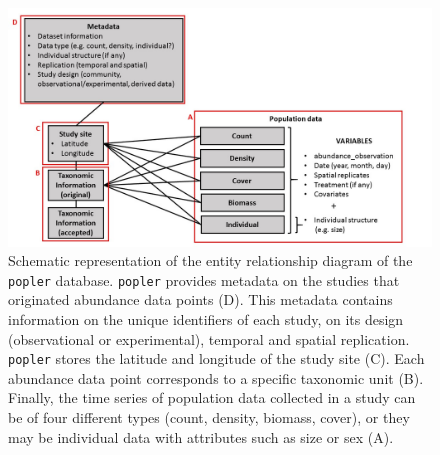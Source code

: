 \documentclass{article}\usepackage[]{graphicx}\usepackage[]{color}
\newcommand{\tom}[1]{{\textit{\color{red}{[#1]}}}}
\begin{document}
\newpage
\begin{figure}[h!]
  \begin{center}
    \includegraphics[scale=0.4]{schema}
    \caption{Schematic representation of the entity relationship diagram of the \texttt{popler} database. \texttt{popler} provides metadata on the studies that originated abundance data points (D). This metadata contains information on the unique identifiers of each study, on its design (observational or experimental), temporal and spatial replication. \texttt{popler} stores the latitude and longitude of the study site (C). Each abundance data point corresponds to a specific taxonomic unit (B). Finally, the time series of population data collected in a study can be of four different types (count, density, biomass, cover), or they may be individual data with attributes such as size or sex (A).\tom{Replace `individual structure' with `individual attribute'.}}
    \label{Fig:schema}
  \end{center}
\end{figure}
\end{document}
